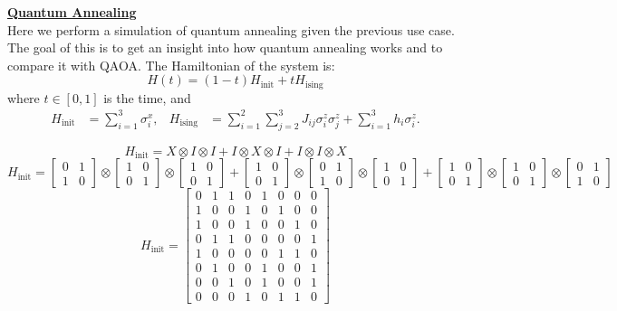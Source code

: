 \documentclass[12pt,a4paper]{report}
\begin{document}
\newpage

\noindent
\textbf{\underline{Quantum Annealing}}
\\

\noindent
Here we perform a simulation of quantum annealing given the previous use case. The goal of this is to get an insight into how quantum annealing works and to compare it with QAOA. The Hamiltonian of the system is:
\[
H(t) = (1-t) H_{\text{init}} + t H_{\text{ising}}
\]
where \(t \in [0, 1]\) is the time, and
\[
\begin{aligned}
H_{\text{init}} &= \sum_{i=1}^{3} \sigma_i^x, & 
H_{\text{ising}} &= \sum_{i=1}^{2} \sum_{j=2}^{3} J_{ij}\sigma_i^z \sigma_j^z + \sum_{i=1}^{3} h_i \sigma_i^z.
\end{aligned}
\]


\[
H_{\text{init}} = X \otimes I \otimes I + I \otimes X \otimes I + I \otimes I \otimes X 
\]
\[
H_{\text{init}} = \begin{bmatrix} 0 & 1 \\ 1 & 0 \end{bmatrix} \otimes \begin{bmatrix} 1 & 0 \\ 0 & 1 \end{bmatrix} \otimes \begin{bmatrix} 1 & 0 \\ 0 & 1 \end{bmatrix} + \begin{bmatrix} 1 & 0 \\ 0 & 1 \end{bmatrix} \otimes \begin{bmatrix} 0 & 1 \\ 1 & 0 \end{bmatrix} \otimes \begin{bmatrix} 1 & 0 \\ 0 & 1 \end{bmatrix} + \begin{bmatrix} 1 & 0 \\ 0 & 1 \end{bmatrix} \otimes \begin{bmatrix} 1 & 0 \\ 0 & 1 \end{bmatrix} \otimes \begin{bmatrix} 0 & 1 \\ 1 & 0 \end{bmatrix}
\]
\[
H_{\text{init}} = \begin{bmatrix}
0 & 1 & 1 & 0 & 1 & 0 & 0 & 0 \\
1 & 0 & 0 & 1 & 0 & 1 & 0 & 0 \\
1 & 0 & 0 & 1 & 0 & 0 & 1 & 0 \\
0 & 1 & 1 & 0 & 0 & 0 & 0 & 1 \\
1 & 0 & 0 & 0 & 0 & 1 & 1 & 0 \\
0 & 1 & 0 & 0 & 1 & 0 & 0 & 1 \\
0 & 0 & 1 & 0 & 1 & 0 & 0 & 1 \\
0 & 0 & 0 & 1 & 0 & 1 & 1 & 0
\end{bmatrix}
\]
\end{document}
